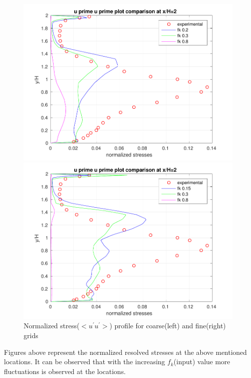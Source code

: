 \begin{figure}[H]
\begin{minipage}[b]{0.5\linewidth}
\includegraphics[scale=0.5]{figure/coarse/UU_coarse_two.pdf}
\end{minipage}
\begin{minipage}[b]{0.5\linewidth}
\includegraphics[scale=0.5]{figure/fine/UU_fine_two.pdf}
\end{minipage}
\caption{Normalized stress($<u^{'}u^{'}>$) profile for coarse(left) and fine(right) grids}
\label{fig:eight}
\end{figure}
Figures above represent the normalized resolved stresses at the above mentioned locations. It can be observed that with the increasing $f_k$(input) value more fluctuations is observed at the locations.

